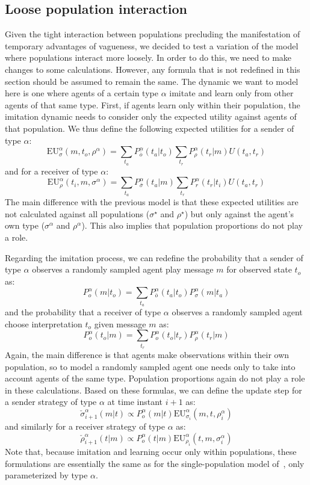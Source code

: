 \documentclass[a4paper]{article}
\begin{document}
\subsection{Loose population interaction}
\label{sec:loose-interaction-model}
Given the tight interaction between populations precluding the manifestation of temporary advantages of vagueness, we decided to test a variation of the model where populations interact more loosely.
In order to do this, we need to make changes to some calculations.
However, any formula that is not redefined in this section should be assumed to remain the same.
The dynamic we want to model here is one where agents of a certain type $\alpha$ imitate and learn only from other agents of that same type.
First, if agents learn only within their population, the imitation dynamic needs to consider only the expected utility against agents of that population.
We thus define the following expected utilities for a sender of type $\alpha$:
$$
\text{EU}_{\sigma}^{\alpha}(m,t_{o},\rho^{\alpha})=\sum_{t_{a}}P_{\bar{o}}^{\alpha}(t_{a}|t_{o})\sum_{t_{r}}P_{\rho}^{\alpha}(t_{r}|m)U(t_{a},t_{r})
$$
and for a receiver of type $\alpha$:
$$
\text{EU}_{\rho}^{\alpha}(t_{i},m,\sigma^{\alpha})=\sum_{t_{a}}P_{\bar{\sigma}}^{\alpha}(t_{a}|m)\sum_{t_{r}}P_{r}^{\alpha}(t_{r}|t_{i})U(t_{a},t_{r})
$$
The main difference with the previous model is that these expected utilities are not calculated against all populations ($\sigma^\star$ and $\rho^\star$) but only against the agent's own type ($\sigma^\alpha$ and $\rho^\alpha$).
This also implies that population proportions do not play a role.

Regarding the imitation process, we can redefine the probability that a sender of type $\alpha$ observes a randomly sampled agent play message $m$ for observed state $t_o$ as:
$$
P_{o}^{\alpha}(m|t_{o})=\sum_{t_{a}}P_{\bar{o}}^{\alpha}(t_{a}|t_{o})P_{\sigma}^{\alpha}(m|t_{a})
$$
and the probability that a receiver of type $\alpha$ observes a randomly sampled agent choose interpretation $t_o$ given message $m$ as:
$$
P_{o}^{\alpha}(t_{o}|m)=\sum_{t_{r}}P_{o}^{\alpha}(t_{o}|t_{r})P_{\rho}^{\alpha}(t_{r}|m)
$$
Again, the main difference is that agents make observations within their own population, so to model a randomly sampled agent one needs only to take into account agents of the same type.
Population proportions again do not play a role in these calculations.
Based on these formulas, we can define the update step for a sender strategy of type $\alpha$ at time instant $i+1$ as:
$$
\check{\sigma}_{i+1}^{\alpha}(m|t) \propto P_{o}^{\alpha}(m|t)\text{EU}_{\sigma_{i}}^{\alpha}(m,t,\rho_{i}^{\alpha})
$$
and similarly for a receiver strategy of type $\alpha$ as:
$$
\check{\rho}_{i+1}^{\alpha}(t|m) \propto P_{o}^{\alpha}(t|m)\text{EU}_{\rho_{i}}^{\alpha}(t,m,\sigma_{i}^{\alpha})
$$
Note that, because imitation and learning occur only within populations, these formulations are essentially the same as for the single-population model of~\textcite{franke_vagueness_2017}, only parameterized by type $\alpha$.
\end{document}
